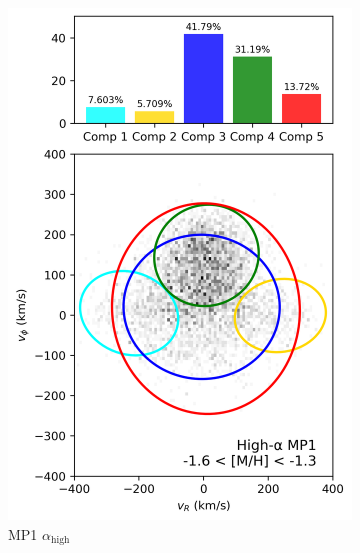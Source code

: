 \documentclass[a4paper,10pt]{article}
\begin{document}
\begin{multicols}{2}
\begin{figure}[H]
\begin{subfigure}[t]{0.24\linewidth}
    \includegraphics[width=\linewidth]{../figures/gmm_mp1_high_alpha_k5.png}
    \caption{MP1 $\alpha_{\mathrm{high}}$}
  \end{subfigure}
  \hfill
  \begin{subfigure}[t]{0.24\linewidth}

\end{subfigure}
\end{figure}
\end{multicols}
\end{document}
